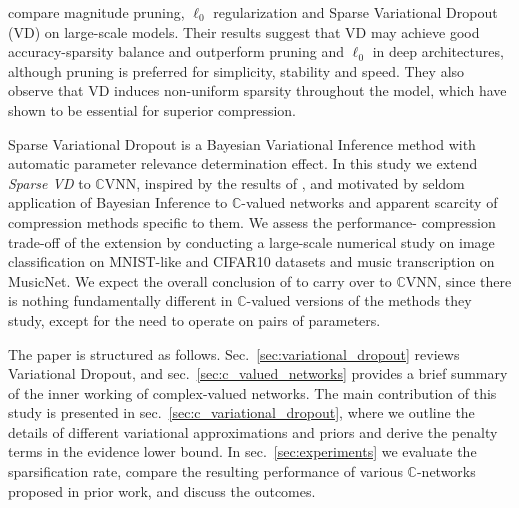 \documentclass[a4paper,10pt,twocolumn]{article}
\newcommand{\cplx}{\mathbb{C}}
\begin{document}
\citet{gale_state_2019} compare magnitude pruning, $\ell_0$ regularization and Sparse
Variational Dropout (VD) on large-scale models. Their results suggest that VD may achieve
good accuracy-sparsity balance and outperform pruning and $\ell_0$ in deep architectures,
although pruning is preferred for simplicity, stability and speed. They also observe that
VD induces non-uniform sparsity throughout the model, which \citet{he_amc:_2018} have shown
to be essential for superior compression.

Sparse Variational Dropout is a Bayesian Variational Inference method with automatic
parameter relevance determination effect. In this study we extend \emph{Sparse VD} to
$\cplx$VNN, inspired by the results of \citet{gale_state_2019}, and motivated by seldom
application of Bayesian Inference to $\cplx$-valued networks \citep{popa_complex-valued_2018}
and apparent scarcity of compression methods specific to them. We assess the performance-%
compression trade-off of the extension by conducting a large-scale numerical study on
image classification on MNIST-like and CIFAR10 datasets and music transcription on MusicNet.
%
%
We expect the overall conclusion of \citet{gale_state_2019} to carry over to $\cplx$VNN,
since there is nothing fundamentally different in $\cplx$-valued versions of the methods
they study, except for the need to operate on pairs of parameters.

The paper is structured as follows. Sec.~\ref{sec:variational_dropout} reviews Variational
Dropout, and sec.~\ref{sec:c_valued_networks} provides a brief summary of the inner
working of complex-valued networks. The main contribution of this study is presented in
sec.~\ref{sec:c_variational_dropout}, where we outline the details of different variational
approximations and priors and derive the penalty terms in the evidence lower bound.
In sec.~\ref{sec:experiments} we evaluate the sparsification rate, compare the resulting
performance of various $\cplx$-networks proposed in prior work, and discuss the outcomes.
\end{document}
